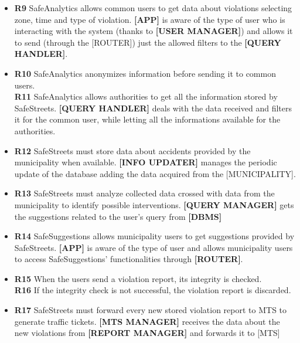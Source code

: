 \documentclass[./main.tex]{subfiles}
\begin{document}

\begin{itemize}
\item
  \textbf{R9} SafeAnalytics allows common users to get data about
  violations selecting zone, time and type of violation.
  \subitem	
	\textbf{[APP]} is aware of the type of user who is interacting with the system (thanks to \textbf{[USER MANAGER]}) and allows it to send (through the [ROUTER]) just the allowed filters to the \textbf{[QUERY HANDLER]}.
  
\item
  \textbf{R10} SafeAnalytics anonymizes information before sending it to
  common users.\\
  \textbf{R11} SafeAnalytics allows authorities to get all the information
  stored by SafeStreets.
  \subitem
    \textbf{[QUERY HANDLER]} deals with the data received and filters it for the common user, while letting all the informations available for the authorities.

\end{itemize}

\begin{itemize}
\item
  \textbf{R12} SafeStreets must store data about accidents provided by
  the municipality when available.
  \subitem
    \textbf{[INFO UPDATER]} manages the periodic update of the database adding the data acquired from the [MUNICIPALITY].
    
\item
  \textbf{R13} SafeStreets must analyze collected data crossed with data
  from the municipality to identify possible interventions.
  \subitem
    \textbf{[QUERY MANAGER]} gets the suggestions related to the user's query from \textbf{[DBMS]} %
    
\item
  \textbf{R14} SafeSuggestions allows municipality users to get
  suggestions provided by SafeStreets.
  \subitem
  	\textbf{[APP]} is aware of the type of user and  allows municipality users to access SafeSuggestions' functionalities through \textbf{[ROUTER]}. 
\end{itemize}


\begin{itemize}
\item
  \textbf{R15} When the users send a violation report, its integrity is
  checked. \\
  \textbf{R16} If the integrity check is not successful, the violation
  report is discarded.
  \subitem
  
\item
  \textbf{R17} SafeStreets must forward every new stored violation
  report to MTS to generate traffic tickets.
  \subitem
    \textbf{[MTS MANAGER]} receives the data about the new violations from \textbf{[REPORT MANAGER]} and forwards it to [MTS]
\end{itemize}
\end{document}
